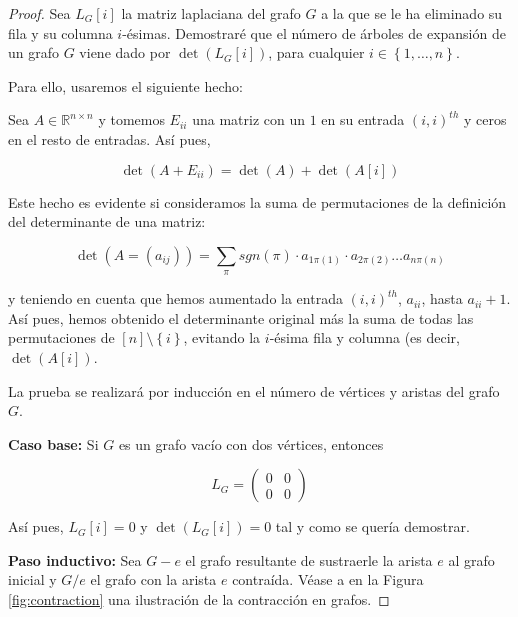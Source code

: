 \begin{proof}
Sea $L_G[i]$ la matriz laplaciana del grafo $G$ a la que se le ha eliminado su fila y su columna $i$-ésimas. Demostraré que el número de árboles de expansión de un grafo $G$ viene dado por $\det(L_G[i])$, para cualquier $i \in \left\lbrace 1,\dots,n \right\rbrace$.

Para ello, usaremos el siguiente hecho:

\begin{proposition}\label{prop:fact}
Sea $A \in \mathbb{R}^{n\times n}$ y tomemos $E_{ii}$ una matriz con un $1$ en su entrada $(i,i)^{th}$ y ceros en el resto de entradas. Así pues,

\begin{equation}
\det(A+E_{ii}) = \det(A)+\det(A[i])
\end{equation}

Este hecho es evidente si consideramos la suma de permutaciones de la definición del determinante de una matriz:

\begin{equation}
\det(A = (a_{ij})) = \sum_{\pi}{sgn(\pi) \cdot a_{1\pi(1)} \cdot a_{2\pi(2)} \dots a_{n\pi(n)}}
\end{equation}

y teniendo en cuenta que hemos aumentado la entrada $(i,i)^{th}$, $a_{ii}$, hasta $a_{ii}+1$. Así pues, hemos obtenido el determinante original más la suma de todas las permutaciones de $[n]\setminus \left\lbrace i \right\rbrace$, evitando la $i$-ésima fila y columna (es decir, $\det(A[i])$.
\end{proposition}

La prueba se realizará por inducción en el número de vértices y aristas del grafo $G$.

\textbf{Caso base:} Si $G$ es un grafo vacío con dos vértices, entonces

\begin{equation}
L_G =
\begin{pmatrix}
0 & 0 \\
0 & 0
\end{pmatrix}
\end{equation}

Así pues, $L_G[i] = 0$ y $\det(L_G[i]) = 0$ tal y como se quería demostrar.

\textbf{Paso inductivo:} Sea $G-e$ el grafo resultante de sustraerle la arista $e$ al grafo inicial y $G/e$ el grafo con la arista $e$ contraída. Véase a en la Figura \ref{fig:contraction} una ilustración de la contracción en grafos.


\end{proof}
